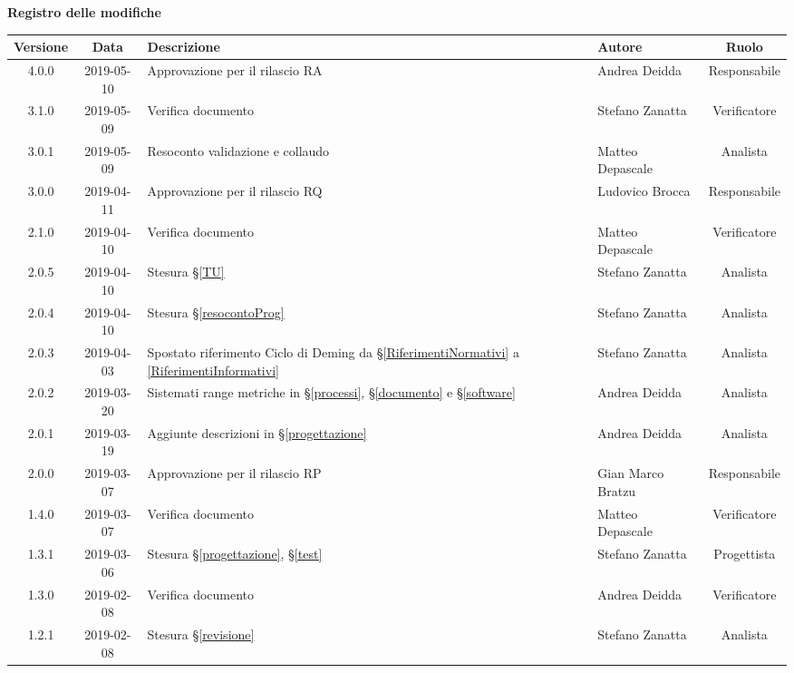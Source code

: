 	\begin{center}
		\textbf{Registro delle modifiche}
	\end{center}
	\begin{center}
		\begin{tabularx}{\textwidth}{|c|c|X|X|c|}
			\hline
			\textbf{Versione} & \textbf{Data} & \textbf{Descrizione} & \textbf{Autore} & \textbf{Ruolo} \\\hline
			\hline
			4.0.0 & 2019-05-10 &  Approvazione per il rilascio RA & Andrea Deidda & Responsabile\\
			\hline
			3.1.0 & 2019-05-09 &  Verifica documento & Stefano Zanatta & Verificatore \\
			\hline
			3.0.1 & 2019-05-09 &  Resoconto validazione e collaudo & Matteo Depascale & Analista \\
			\hline
			3.0.0 & 2019-04-11 &  Approvazione per il rilascio RQ & Ludovico Brocca & Responsabile \\
			\hline
			2.1.0 & 2019-04-10 &  Verifica documento & Matteo Depascale & Verificatore \\
			\hline
			2.0.5 & 2019-04-10 &  Stesura  \S\ref{TU} & Stefano Zanatta & Analista \\
			\hline
			2.0.4 & 2019-04-10 &  Stesura  \S\ref{resocontoProg} & Stefano Zanatta & Analista \\
			\hline
			2.0.3 & 2019-04-03 & Spostato riferimento Ciclo di Deming da \S\ref{RiferimentiNormativi} a \ref{RiferimentiInformativi} & Stefano Zanatta & Analista \\
			\hline
			2.0.2 & 2019-03-20 &  Sistemati range metriche in \S\ref{processi}, \S\ref{documento} e \S\ref{software} & Andrea Deidda & Analista \\
			\hline
			2.0.1 & 2019-03-19 &  Aggiunte descrizioni in \S\ref{progettazione} & Andrea Deidda & Analista \\
			\hline
			2.0.0 & 2019-03-07 &  Approvazione per il rilascio RP & Gian Marco Bratzu & Responsabile \\
			\hline
			1.4.0 & 2019-03-07 &  Verifica documento & Matteo Depascale & Verificatore \\
			\hline
			1.3.1 & 2019-03-06 &  Stesura \S\ref{progettazione}, \S\ref{test} & Stefano Zanatta & Progettista \\
			\hline
			1.3.0 & 2019-02-08 &  Verifica documento & Andrea Deidda & Verificatore \\
			\hline
			1.2.1 & 2019-02-08 &  Stesura \S\ref{revisione} & Stefano Zanatta & Analista \\

\end{tabularx}
\end{center}

